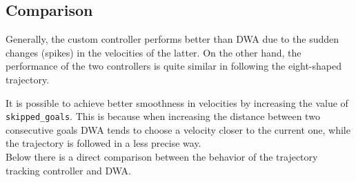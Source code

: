 \documentclass[11pt,a4paper]{article}
\begin{document}

\subsection{Comparison}

Generally, the custom controller performs better than DWA due to the sudden changes (spikes) in
the velocities of the latter.
On the other hand, the performance of the two controllers is quite similar in following
the eight-shaped trajectory.

It is possible to achieve better smoothness in velocities by increasing the value
of \texttt{skipped\_goals}.
This is because when increasing the distance between two consecutive goals DWA tends to choose
a velocity closer to the current one, while the trajectory is followed in a less precise way.\\

Below there is a direct comparison between the behavior of the trajectory tracking controller and DWA.
\end{document}
